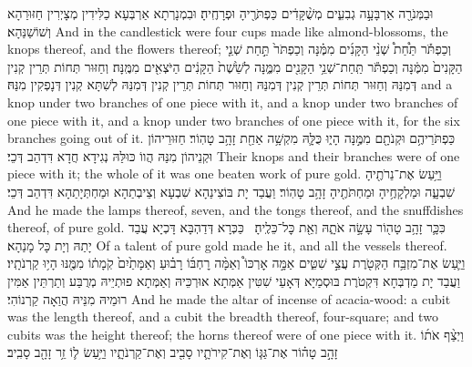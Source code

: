 {וּבַמְּנֹרָ֖ה אַרְבָּעָ֣ה גְבִעִ֑ים מְשֻׁ֨קָּדִ֔ים כַּפְתֹּרֶ֖יהָ וּפְרָחֶֽיהָ׃}
{וּבִמְנָרְתָא אַרְבְּעָא כַלִּידִין מְצָיְרִין חַזּוּרַהָא וְשׁוֹשַׁנַּהָא׃}
{And in the candlestick were four cups made like almond-blossoms, the knops thereof, and the flowers thereof;}{}
{וְכַפְתֹּ֡ר תַּ֩חַת֩ שְׁנֵ֨י הַקָּנִ֜ים מִמֶּ֗נָּה וְכַפְתֹּר֙ תַּ֣חַת שְׁנֵ֤י הַקָּנִים֙ מִמֶּ֔נָּה וְכַפְתֹּ֕ר תַּֽחַת־שְׁנֵ֥י הַקָּנִ֖ים מִמֶּ֑נָּה לְשֵׁ֙שֶׁת֙ הַקָּנִ֔ים הַיֹּצְאִ֖ים מִמֶּֽנָּה׃}
{וְחַזּוּר תְּחוֹת תְּרֵין קְנִין דְּמִנַּהּ וְחַזּוּר תְּחוֹת תְּרֵין קְנִין דְּמִנַּהּ וְחַזּוּר תְּחוֹת תְּרֵין קְנִין דְּמִנַּהּ לְשִׁתָּא קְנִין דְּנָפְקִין מִנַּהּ׃}
{and a knop under two branches of one piece with it, and a knop under two branches of one piece with it, and a knop under two branches of one piece with it, for the six branches going out of it.}{}
{כַּפְתֹּרֵיהֶ֥ם וּקְנֹתָ֖ם מִמֶּ֣נָּה הָי֑וּ כֻּלָּ֛הּ מִקְשָׁ֥ה אַחַ֖ת זָהָ֥ב טָהֽוֹר׃}
{חַזּוּרֵיהוֹן וּקְנֵיהוֹן מִנַּהּ הֲווֹ כּוּלַּהּ נְגִידָא חֲדָא דִּדְהַב דְּכֵי׃}
{Their knops and their branches were of one piece with it; the whole of it was one beaten work of pure gold.}{}
{וַיַּ֥עַשׂ אֶת־נֵרֹתֶ֖יהָ שִׁבְעָ֑ה וּמַלְקָחֶ֥יהָ וּמַחְתֹּתֶ֖יהָ זָהָ֥ב טָהֽוֹר׃}
{וַעֲבַד יָת בּוֹצִינַהָא שִׁבְעָא וְצֵיבְתַהָא וּמַחְתְּיָתַהָא דִּדְהַב דְּכֵי׃}
{And he made the lamps thereof, seven, and the tongs thereof, and the snuffdishes thereof, of pure gold.}{}
{כִּכָּ֛ר זָהָ֥ב טָה֖וֹר עָשָׂ֣ה אֹתָ֑הּ וְאֵ֖ת כׇּל־כֵּלֶֽיהָ׃ \petucha }
{כַּכְּרָא דְּדַהְבָּא דָּכְיָא עֲבַד יָתַהּ וְיָת כָּל מָנַהָא׃}
{Of a talent of pure gold made he it, and all the vessels thereof.}{}
{וַיַּ֛עַשׂ אֶת־מִזְבַּ֥ח הַקְּטֹ֖רֶת עֲצֵ֣י שִׁטִּ֑ים אַמָּ֣ה אׇרְכּוֹ֩ וְאַמָּ֨ה רׇחְבּ֜וֹ רָב֗וּעַ וְאַמָּתַ֙יִם֙ קֹֽמָת֔וֹ מִמֶּ֖נּוּ הָי֥וּ קַרְנֹתָֽיו׃}
{וַעֲבַד יָת מַדְבְּחָא דִּקְטֹרֶת בּוּסְמַיָּא דְּאָעֵי שִׁטִּין אַמְּתָא אוּרְכֵּיהּ וְאַמְּתָא פוּתְיֵיהּ מְרֻבַּע וְתַרְתֵּין אַמִּין רוּמֵיהּ מִנֵּיהּ הֲוַאָה קַרְנוֹהִי׃}
{And he made the altar of incense of acacia-wood: a cubit was the length thereof, and a cubit the breadth thereof, four-square; and two cubits was the height thereof; the horns thereof were of one piece with it.}{}
{וַיְצַ֨ף אֹת֜וֹ זָהָ֣ב טָה֗וֹר אֶת־גַּגּ֧וֹ וְאֶת־קִירֹתָ֛יו סָבִ֖יב וְאֶת־קַרְנֹתָ֑יו וַיַּ֥עַשׂ ל֛וֹ זֵ֥ר זָהָ֖ב סָבִֽיב׃}

